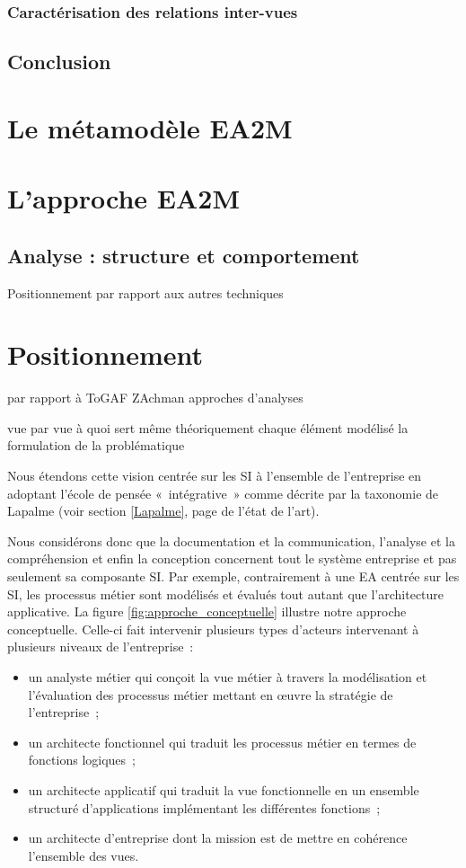     \subsubsection{Caractérisation des relations inter-vues}
    \subsection{Conclusion}


\section{Le métamodèle EA2M}
    

\section{L'approche EA2M}

\subsection{Analyse : structure et comportement}
Positionnement par rapport aux autres techniques

\section{Positionnement}
par rapport à ToGAF
ZAchman
approches d'analyses

vue par vue à quoi sert même théoriquement
chaque élément modélisé la formulation de la problématique


Nous étendons
cette vision centrée sur les SI à l'ensemble de l'entreprise en adoptant l'école
de pensée «~intégrative~» comme décrite par la taxonomie de Lapalme (voir
section \ref{Lapalme}, page \pageref{Lapalme} de l'état de l'art).

Nous considérons donc que la documentation et la communication, l'analyse et la
compréhension et enfin la conception concernent tout le système entreprise et
pas seulement sa composante SI. Par exemple, contrairement à une EA centrée sur
les SI, les processus métier sont modélisés et évalués tout autant que
l'architecture applicative. La figure \ref{fig:approche_conceptuelle} illustre
notre approche conceptuelle. Celle-ci fait intervenir plusieurs types d'acteurs
intervenant à plusieurs niveaux de l'entreprise~: \begin{itemize} \item un
analyste métier qui conçoit la vue métier à travers la modélisation et
l'évaluation des processus métier mettant en œuvre la stratégie de
l'entreprise~; \item un architecte fonctionnel qui traduit les processus métier
en termes de fonctions logiques~; \item un architecte applicatif qui traduit la
vue fonctionnelle en un ensemble structuré d'applications implémentant les
différentes fonctions~; \item un architecte d'entreprise dont la mission est de
mettre en cohérence l'ensemble des vues. \end{itemize}

